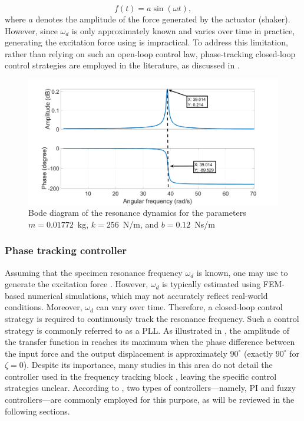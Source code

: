 \documentclass[lettersize,journal]{IEEEtran}
\begin{document}
\begin{equation}
f(t)=a\sin(\omega t),
\label{E_F_resonance}
\end{equation}
where $a$ denotes the amplitude of the force generated by the actuator (shaker). However, since $\omega_d$ is only approximately known and varies over time in practice, generating the excitation force using  is impractical. To address this limitation, rather than relying on such an open-loop control law, phase-tracking closed-loop control strategies are employed in the literature, as discussed in .

\begin{figure}
    \centering    \includegraphics[width=\linewidth]{F_bode.png}
    \caption{Bode diagram of the resonance dynamics for the parameters $m=0.01772$~kg, $k=256$~N/m, and $b=0.12$~Ns/m}
    \label{F_Bode}
\end{figure}




\subsubsection{Phase tracking controller} \label{S_frequency_controller}


Assuming that the specimen resonance frequency $\omega_d$ is known, one may use  to generate the excitation force \cite{SCHNEIDER2018171,herrmann2018simulation_Thesis,SCHRAMM2024117045}. However, $\omega_d$ is typically estimated using FEM-based numerical simulations, which may not accurately reflect real-world conditions. Moreover, $\omega_d$ can vary over time. Therefore, a closed-loop control strategy is required to continuously track the resonance frequency. Such a control strategy is commonly referred to as a PLL. As illustrated in , the amplitude of the transfer function in  reaches its maximum when the phase difference between the input force and the output displacement is approximately $90^\circ$ (exactly $90^\circ$ for $\zeta = 0$). Despite its importance, many studies in this area do not detail the controller used in the frequency tracking block \cite{Gautrelet_2020}, leaving the specific control strategies unclear. According to , two types of controllers—namely, PI and fuzzy controllers—are commonly employed for this purpose, as will be reviewed in the following sections.
\end{document}
